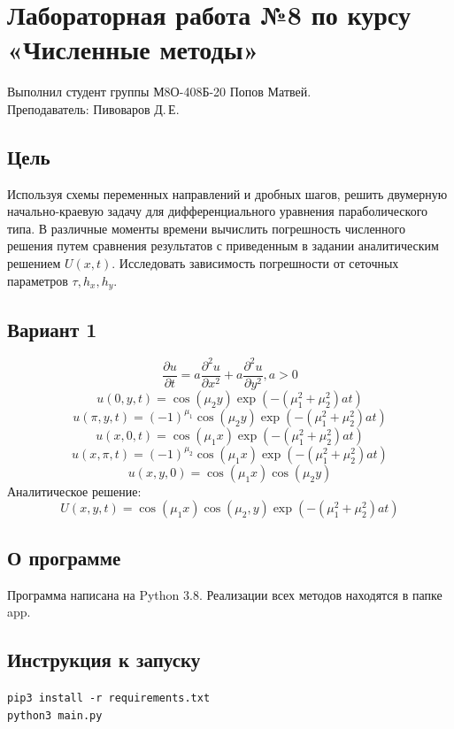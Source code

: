 \documentclass{article}
\begin{document}
\section*{Лабораторная работа №8 по курсу «Численные методы»}

Выполнил студент группы М8О-408Б-20 Попов Матвей.
\\
Преподаватель: Пивоваров Д.\,Е.

\subsection*{Цель}

Используя схемы переменных направлений и дробных шагов, решить двумерную 
начально-краевую задачу для дифференциального уравнения параболического типа. 
В различные моменты времени вычислить погрешность численного решения путем 
сравнения результатов с приведенным в задании аналитическим решением $U(x, t)$. 
Исследовать зависимость погрешности от сеточных параметров $\tau, h_x, h_y$.

\subsection*{Вариант 1}
$$\frac{\partial u}{\partial t} = a \frac{\partial^2 u}{\partial x^2} + a \frac{\partial^2 u}{\partial y^2}, a > 0$$
$$u(0,y,t) = \cos{(\mu_2y)}\exp{(-(\mu_1^2 + \mu_2^2)at)}$$
$$u(\pi,y,t) = (-1)^{\mu_1}\cos{(\mu_2 y)}\exp{(-(\mu_1^2 + \mu_2^2)at)}$$
$$u(x,0,t) = \cos{(\mu_1 x)}\exp{(-(\mu_1^2 + \mu_2^2)at)}$$
$$u(x,\pi,t) = (-1)^{\mu_2}\cos{(\mu_1 x)}\exp{(-(\mu_1^2 + \mu_2^2)at)}$$
$$u(x,y,0) = \cos{(\mu_1 x)}\cos{(\mu_2 y)}$$
Аналитическое решение: $$U(x,y,t) = \cos{(\mu_1 x)}\cos{(\mu_2, y)}\exp{(-(\mu_1^2 + \mu_2^2)at)}$$

\subsection*{О программе}
Программа написана на Python 3.8. Реализации всех методов находятся в папке 
app.

\subsection*{Инструкция к запуску}
\texttt{pip3 install -r requirements.txt}\\
\texttt{python3 main.py}\\
\end{document}
